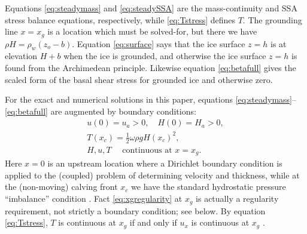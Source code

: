 \documentclass[twocolumn,letterpaper]{igs}
\begin{document}
Equations \eqref{eq:steadymass} and \eqref{eq:steadySSA} are the mass-continuity and SSA stress balance equations, respectively, while \eqref{eq:Tstress} defines $T$.  The grounding line $x=x_g$ is a location which must be solved-for, but there we have $\rho H = \rho_w (z_o - b)$.  Equation \eqref{eq:surface} says that the ice surface $z=h$ is at elevation $H+b$ when the ice is grounded, and otherwise the ice surface $z=h$ is found from the Archimedean principle.  Likewise equation \eqref{eq:betafull} gives the scaled form of the basal shear stress for grounded ice and otherwise zero.

For the exact and numerical solutions in this paper, equations \eqref{eq:steadymass}--\eqref{eq:betafull} are augmented by boundary conditions:
\begin{gather}
u(0) = u_a > 0, \quad H(0) = H_a > 0, \label{eq:leftbc} \\
T(x_c) = \frac{1}{2} \omega \rho g H(x_c)^2,  \label{eq:rightbc} \\
H, u, T \quad \text{ continuous at } x = x_g.  \label{eq:xgregularity}
\end{gather}
Here $x=0$ is an upstream location where a Dirichlet boundary condition is applied to the (coupled) problem of determining velocity and thickness, while at the (non-moving) calving front $x_c$ we have the standard hydrostatic pressure ``imbalance'' condition \citep{SchoofMarine1}.  Fact \eqref{eq:xgregularity} at $x_g$ is actually a regularity requirement, not strictly a boundary condition; see below.  By equation \eqref{eq:Tstress}, $T$ is continuous at $x_g$ if and only if $u_x$ is continuous at $x_g$ \citep{SchoofMarine1}.
\end{document}

